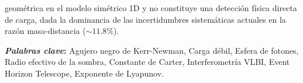 geométrica en el modelo simétrico 1D y no constituye una detección física directa de carga, dada la dominancia de las incertidumbres sistemáticas actuales en la razón masa-distancia ($\sim 11.8\%$).

\vspace{0.5cm}
\raggedright 
{\bf \textit{Palabras clave}:} Agujero negro de Kerr-Newman, Carga débil, Esfera de fotones, Radio efectivo de la sombra, Constante de Carter, Interferometría VLBI, Event Horizon Telescope, Exponente de Lyapunov.
